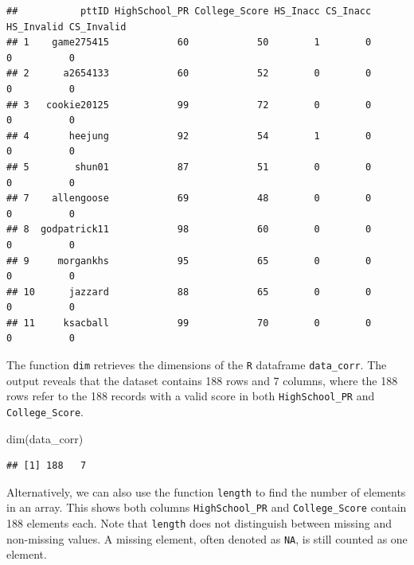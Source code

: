\documentclass[
]{article}
\newenvironment{Shaded}{\begin{snugshade}}{\end{snugshade}}
\newcommand{\FunctionTok}[1]{\textcolor[rgb]{0.00,0.00,0.00}{#1}}
\newcommand{\NormalTok}[1]{#1}
\newcommand{\SpecialCharTok}[1]{\textcolor[rgb]{0.00,0.00,0.00}{#1}}
\begin{document}
\begin{verbatim}
##           pttID HighSchool_PR College_Score HS_Inacc CS_Inacc HS_Invalid CS_Invalid
## 1    game275415            60            50        1        0          0          0
## 2      a2654133            60            52        0        0          0          0
## 3   cookie20125            99            72        0        0          0          0
## 4       heejung            92            54        1        0          0          0
## 5        shun01            87            51        0        0          0          0
## 7    allengoose            69            48        0        0          0          0
## 8  godpatrick11            98            60        0        0          0          0
## 9     morgankhs            95            65        0        0          0          0
## 10      jazzard            88            65        0        0          0          0
## 11     ksacball            99            70        0        0          0          0
\end{verbatim}

The function \texttt{dim} retrieves the dimensions of the \texttt{R}
dataframe \texttt{data\_corr}. The output reveals that the dataset
contains 188 rows and 7 columns, where the 188 rows refer to the 188
records with a valid score in both \texttt{HighSchool\_PR} and
\texttt{College\_Score}.

\begin{Shaded}
\begin{Highlighting}[]
\FunctionTok{dim}\NormalTok{(data\_corr)}
\end{Highlighting}
\end{Shaded}

\begin{verbatim}
## [1] 188   7
\end{verbatim}

Alternatively, we can also use the function \texttt{length} to find the
number of elements in an array. This shows both columns
\texttt{HighSchool\_PR} and \texttt{College\_Score} contain 188 elements
each. Note that \texttt{length} does not distinguish between missing and
non-missing values. A missing element, often denoted as \texttt{NA}, is
still counted as one element.

\begin{Shaded}
\end{Shaded}
\end{document}
